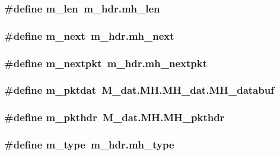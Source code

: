 \label{mbuf_8hh_abae9862c92061cacb9113955f2dd4f2d}
\hypertarget{mbuf_8hh_aa1fcd27b1ef71b502acf03511fb32774}{
\subsubsection[{m\_\-len}]{\setlength{\rightskip}{0pt plus 5cm}\#define m\_\-len~m\_\-hdr.mh\_\-len}}
\label{mbuf_8hh_aa1fcd27b1ef71b502acf03511fb32774}
\hypertarget{mbuf_8hh_a9def56bacea65366a0c3047abee0022b}{
\subsubsection[{m\_\-next}]{\setlength{\rightskip}{0pt plus 5cm}\#define m\_\-next~m\_\-hdr.mh\_\-next}}
\label{mbuf_8hh_a9def56bacea65366a0c3047abee0022b}
\hypertarget{mbuf_8hh_a3be154745693129279eb8cf2ae1b0551}{
\subsubsection[{m\_\-nextpkt}]{\setlength{\rightskip}{0pt plus 5cm}\#define m\_\-nextpkt~m\_\-hdr.mh\_\-nextpkt}}
\label{mbuf_8hh_a3be154745693129279eb8cf2ae1b0551}
\hypertarget{mbuf_8hh_aef5936fb48f5f6194b8fb0c24eacf629}{
\subsubsection[{m\_\-pktdat}]{\setlength{\rightskip}{0pt plus 5cm}\#define m\_\-pktdat~M\_\-dat.MH.MH\_\-dat.MH\_\-databuf}}
\label{mbuf_8hh_aef5936fb48f5f6194b8fb0c24eacf629}
\hypertarget{mbuf_8hh_a278695b91f18d93ecd23a815f54e617d}{
\subsubsection[{m\_\-pkthdr}]{\setlength{\rightskip}{0pt plus 5cm}\#define m\_\-pkthdr~M\_\-dat.MH.MH\_\-pkthdr}}
\label{mbuf_8hh_a278695b91f18d93ecd23a815f54e617d}
\hypertarget{mbuf_8hh_aa85d63af1da9cfc5a9c7b9f7e29dfb41}{
\subsubsection[{m\_\-type}]{\setlength{\rightskip}{0pt plus 5cm}\#define m\_\-type~m\_\-hdr.mh\_\-type}}
\label{mbuf_8hh_aa85d63af1da9cfc5a9c7b9f7e29dfb41}
